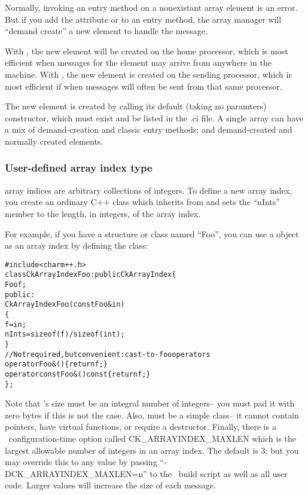 Normally, invoking an entry method on a nonexistant array
element is an error.  But if you add the attribute
 
\kw{[createhere]} or \kw{[createhome]} to an entry method,
 the array manager will 
``demand create'' a new element to handle the message.  

With \kw{[createhome]}, the new element
will be created on the home processor, which is most efficient when messages for
the element may arrive from anywhere in the machine. With \kw{[createhere]},
the new element is created on the sending processor, which is most efficient
if when messages will often be sent from that same processor.

The new element is created by calling its default (taking no
paramters) constructor, which must exist and be listed in the .ci file.
A single array can have a mix of demand-creation and
classic entry methods; and demand-created and normally 
created elements.



\subsubsection{User-defined array index type}

\charmpp{} array indices are arbitrary collections of integers.
To define a new array index, you create an ordinary C++ class 
which inherits from  and sets the ``nInts'' member
to the length, in integers, of the array index.

For example, if you have a structure or class named ``Foo'', you 
can use a  object as an array index by defining the class:

\begin{alltt}
#include <charm++.h>
class CkArrayIndexFoo:public CkArrayIndex \{
    Foo f;
public:
    CkArrayIndexFoo(const Foo \&in) 
    \{
        f=in;
        nInts=sizeof(f)/sizeof(int);
    \}
    //Not required, but convenient: cast-to-foo operators
    operator Foo &() \{return f;\}
    operator const Foo &() const \{return f;\}
\};
\end{alltt}

Note that 's size must be an integral number of integers--
you must pad it with zero bytes if this is not the case.
Also,  must be a simple class-- it cannot contain 
pointers, have virtual functions, or require a destructor.
Finally, there is a \charmpp\ configuration-time option called
CK\_ARRAYINDEX\_MAXLEN  
which is the largest allowable number of 
integers in an array index.  The default is 3; but you may 
override this to any value by passing ``-DCK\_ARRAYINDEX\_MAXLEN=n'' 
to the \charmpp\ build script as well as all user code. Larger 
values will increase the size of each message.

